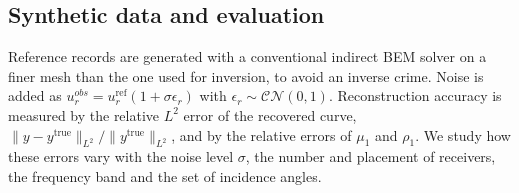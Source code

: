 \subsection{Synthetic data and evaluation}

Reference records are generated with a conventional indirect BEM solver on a
finer mesh than the one used for inversion, to avoid an inverse crime. Noise is
added as $u^{obs}_r = u_r^{\mathrm{ref}}(1 + \sigma\epsilon_r)$ with
$\epsilon_r\sim\mathcal{CN}(0,1)$. Reconstruction accuracy is measured by the
relative $L^2$ error of the recovered curve,
$\|y-y^{\mathrm{true}}\|_{L^2}/\|y^{\mathrm{true}}\|_{L^2}$, and by the relative
errors of $\mu_1$ and $\rho_1$. We study how these errors vary with the noise
level $\sigma$, the number and placement of receivers, the frequency band and the
set of incidence angles.
